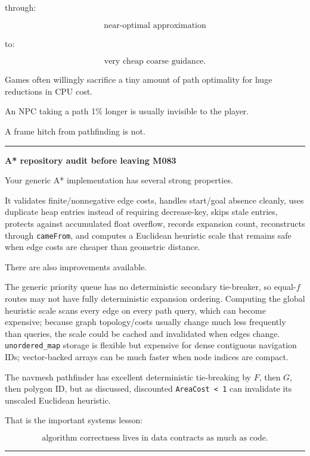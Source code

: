 through:

\[
\text{near-optimal approximation}
\]

to:

\[
\text{very cheap coarse guidance}.
\]

Games often willingly sacrifice a tiny amount of path optimality for huge reductions in CPU cost.

An NPC taking a path 1\% longer is usually invisible to the player.

A frame hitch from pathfinding is not.

\begin{center}\rule{0.5\linewidth}{0.5pt}\end{center}

\textbf{A* repository audit before leaving M083}

Your generic A* implementation has several strong properties.

It validates finite/nonnegative edge costs, handles start/goal absence cleanly, uses duplicate heap entries instead of requiring decrease-key, skips stale entries, protects against accumulated float overflow, records expansion count, reconstructs through \texttt{cameFrom}, and computes a Euclidean heuristic scale that remains safe when edge costs are cheaper than geometric distance.

There are also improvements available.

The generic priority queue has no deterministic secondary tie-breaker, so equal-\(f\) routes may not have fully deterministic expansion ordering. Computing the global heuristic scale scans every edge on every path query, which can become expensive; because graph topology/costs usually change much less frequently than queries, the scale could be cached and invalidated when edges change. \texttt{unordered\_map} storage is flexible but expensive for dense contiguous navigation IDs; vector-backed arrays can be much faster when node indices are compact.

The navmesh pathfinder has excellent deterministic tie-breaking by \(F\), then \(G\), then polygon ID, but as discussed, discounted \texttt{AreaCost\ \textless{}\ 1} can invalidate its unscaled Euclidean heuristic.

That is the important systems lesson:

\[
\boxed{
\text{algorithm correctness lives in data contracts as much as code}.
}
\]

\begin{center}\rule{0.5\linewidth}{0.5pt}\end{center}

